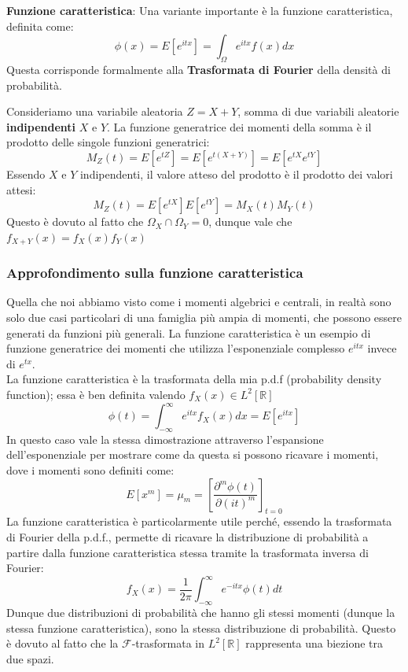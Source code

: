 \documentclass[openany,a4paper,12pt]{book}
\theoremstyle{remark}
\begin{document}
\begin{definizione}
    \textbf{Funzione caratteristica}:
    Una variante importante è la funzione caratteristica, definita come:
    \[
    \phi (x) = E[e^{itx}] = \int_\Omega e^{itx}f(x) dx
    \]
    Questa corrisponde formalmente alla \textbf{Trasformata di Fourier} della densità di probabilità.
\end{definizione}
Consideriamo una variabile aleatoria $Z = X + Y$, somma di due variabili aleatorie \textbf{indipendenti} $X$ e $Y$.
La funzione generatrice dei momenti della somma è il prodotto delle singole funzioni generatrici:
\[
M_Z(t) = E[e^{tZ}] = E[e^{t(X+Y)}] = E[e^{tX}e^{tY}]
\]
Essendo $X$ e $Y$ indipendenti, il valore atteso del prodotto è il prodotto dei valori attesi:
\[
M_Z(t) = E[e^{tX}]E[e^{tY}] = M_X(t)M_Y(t)
\]
Questo è dovuto al fatto che $\Omega_X \cap \Omega_Y=0$, dunque vale che $f_{X+Y}(x)=f_X(x) f_Y(x)$

\subsubsection*{Approfondimento sulla funzione caratteristica}
Quella che noi abbiamo visto come i momenti algebrici e centrali, in realtà sono solo due casi particolari di una famiglia più ampia di momenti, 
che possono essere generati da funzioni più generali. La funzione caratteristica è un esempio di funzione generatrice dei momenti che utilizza l'esponenziale complesso $e^{itx}$ invece di $e^{tx}$.\\
La funzione caratteristica è la trasformata della mia p.d.f (probability density function); essa è ben definita valendo $f_X(x) \in L^2[\mathbb{R}]$
\[
\phi(t) = \int_{-\infty}^{\infty} e^{itx} f_X(x) dx = E[e^{itx}]
\]
In questo caso vale la stessa dimostrazione attraverso l'espansione dell'esponenziale per mostrare come da questa si possono ricavare i momenti, dove i momenti sono definiti come:
\[
E[x^m]= \mu_m = \left[ \frac{\partial ^m \phi(t)}{\partial {(it)}^m}\right]_{t=0}
\]
La funzione caratteristica è particolarmente utile perché, essendo la trasformata di Fourier della p.d.f., permette di ricavare la distribuzione di probabilità a partire dalla funzione caratteristica stessa tramite la trasformata inversa di Fourier:
\[
f_X(x) = \frac{1}{2\pi} \int_{-\infty}^{\infty} e^{-itx} \phi(t) dt
\]
Dunque due distribuzioni di probabilità che hanno gli stessi momenti (dunque la stessa funzione caratteristica), sono la stessa distribuzione di probabilità. 
Questo è dovuto al fatto che la $\mathcal{F}$-trasformata in $L^2[\mathbb{R}]$ rappresenta una biezione tra due spazi.
\end{document}
